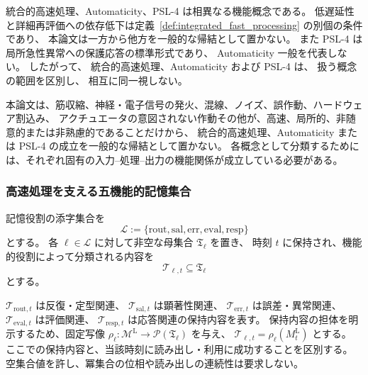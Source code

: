 \begin{remark}
\label{rem:automaticity_fast_psl4}
統合的高速処理、Automaticity、PSL-4 は相異なる機能概念である。
低遅延性と詳細再評価への依存低下は定義~\ref{def:integrated_fast_processing} の別個の条件であり、
本論文は一方から他方を一般的な帰結として置かない。
また PSL-4 は局所急性異常への保護応答の標準形式であり、
Automaticity 一般を代表しない。
したがって、
統合的高速処理、Automaticity および PSL-4 は、
扱う概念の範囲を区別し、
相互に同一視しない。
\end{remark}

\begin{remark}[実装上の付随的事象と機能概念の区別]
\label{rem:structural_operation_implementation_event}
本論文は、筋収縮、神経・電子信号の発火、混線、ノイズ、誤作動、ハードウェア割込み、
アクチュエータの意図されない作動その他が、高速、局所的、非随意的または非熟慮的であることだけから、
統合的高速処理、Automaticity または PSL-4 の成立を一般的な帰結として置かない。
各概念として分類するためには、それぞれ固有の入力--処理--出力の機能関係が成立している必要がある。
\end{remark}

\subsubsection{高速処理を支える五機能的記憶集合}
\label{subsubsec:fast_memory}

\begin{definition}
\label{def:fast_memory_sets}
記憶役割の添字集合を
\[
  \mathcal L
  :=
  \{\mathrm{rout},\mathrm{sal},\mathrm{err},\mathrm{eval},\mathrm{resp}\}
\]
とする。
各 $\ell\in\mathcal L$ に対して非空な母集合 $\mathfrak T_\ell$ を置き、
時刻 $t$ に保持され、機能的役割によって分類される内容を
\[
  \mathcal T_{\ell,t}\subseteq\mathfrak T_\ell
\]
とする。

$\mathcal T_{\mathrm{rout},t}$ は反復・定型関連、
$\mathcal T_{\mathrm{sal},t}$ は顕著性関連、
$\mathcal T_{\mathrm{err},t}$ は誤差・異常関連、
$\mathcal T_{\mathrm{eval},t}$ は評価関連、
$\mathcal T_{\mathrm{resp},t}$ は応答関連の保持内容を表す。
保持内容の担体を明示するため、固定写像
$\rho_\ell:\mathcal M^{\mathrm L}\to\mathcal P(\mathfrak T_\ell)$ を与え、
$\mathcal T_{\ell,t}=\rho_\ell(M_t^{\mathrm L})$ とする。
ここでの保持内容と、当該時刻に読み出し・利用に成功することを区別する。
空集合値を許し、冪集合の位相や読み出しの連続性は要求しない。
\end{definition}

